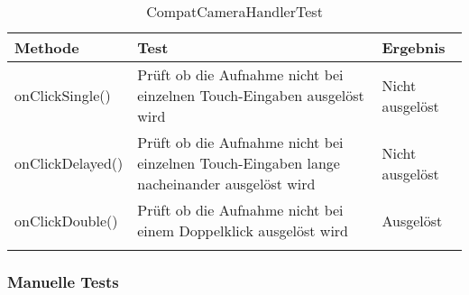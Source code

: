 \begin{longtable}{p{} | p{} | p{}}
\hline
  \textbf{Methode} & \textbf{Test} & \textbf{Ergebnis}\\
   \hline
   onClickSingle() & Prüft ob die Aufnahme nicht bei einzelnen Touch-Eingaben ausgelöst wird & Nicht ausgelöst \\
   \hline
   onClickDelayed() & Prüft ob die Aufnahme nicht bei einzelnen Touch-Eingaben lange nacheinander ausgelöst wird & Nicht ausgelöst \\
   \hline
   onClickDouble() & Prüft ob die Aufnahme nicht bei einem Doppelklick ausgelöst wird & Ausgelöst \\
   \hline
  \caption{CompatCameraHandlerTest}
\end{longtable}
 
 
 
\subsubsection{Manuelle Tests}

